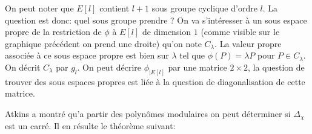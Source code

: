 \documentclass[12pt]{article}
\begin{document}
On peut noter que $E[l]$ contient $l+1$ sous groupe cyclique d'ordre $l$.
La question est donc: quel sous groupe prendre ? On va s’intéresser à un sous espace propre de la restriction de $\phi$ à $E[l]$ de dimension $1$ (comme visible sur le graphique précédent on prend une droite) qu'on note $C_{\lambda}$. La valeur propre associée à ce sous espace propre est bien sur $\lambda$ tel que $\phi(P) = \lambda P$ pour $P \in C_{\lambda}$. On décrit $C_{\lambda}$ par $g_l$.
\newline
On peut décrire $\phi_{|E[l]}$ par une matrice $2\times2$, la question de trouver des sous espaces propres est liée à la question de diagonalisation de cette matrice.

Atkins a montré qu'a partir des polynômes modulaires on peut déterminer si $\Delta_{\chi}$ est un carré. Il en résulte le théorème suivant:
\end{document}
